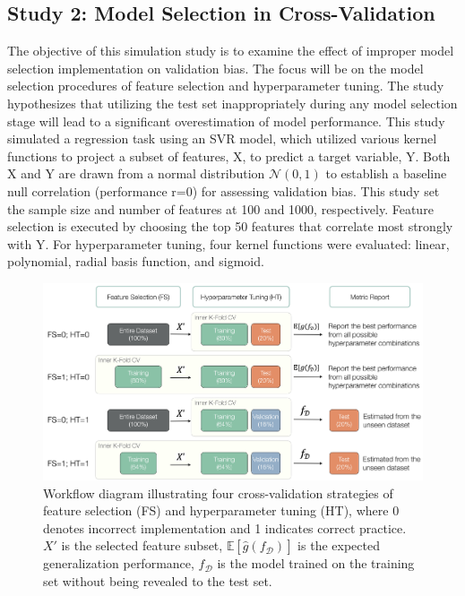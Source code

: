 \subsection{Study 2: Model Selection in Cross-Validation}

The objective of this simulation study is to examine the effect of improper model selection implementation on validation bias. The focus will be on the model selection procedures of feature selection and hyperparameter tuning. The study hypothesizes that utilizing the test set inappropriately during any model selection stage will lead to a significant overestimation of model performance. This study simulated a regression task using an SVR model, which utilized various kernel functions to project a subset of features, X, to predict a target variable, Y. Both X and Y are drawn from a normal distribution $\mathcal{N}(0, 1)$ to establish a baseline null correlation (performance r=0) for assessing validation bias. This study set the sample size and number of features at 100 and 1000, respectively. Feature selection is executed by choosing the top 50 features that correlate most strongly with Y. For hyperparameter tuning, four kernel functions were evaluated: linear, polynomial, radial basis function, and sigmoid.
\begin{figure}[h]
    \centering
    \includegraphics[width=1\textwidth]{fig_s2_schemes.jpg}
    \caption{Workflow diagram illustrating four cross-validation strategies of feature selection (FS) and hyperparameter tuning (HT), where 0 denotes incorrect implementation and 1 indicates correct practice. $X'$ is the selected feature subset, $\mathbb{E}[\hat{g}(f_\mathcal{D})]$ is the expected generalization performance, $f_\mathcal{D}$ is the model trained on the training set without being revealed to the test set.}
    \label{fig:s2_schemes}
\end{figure}

